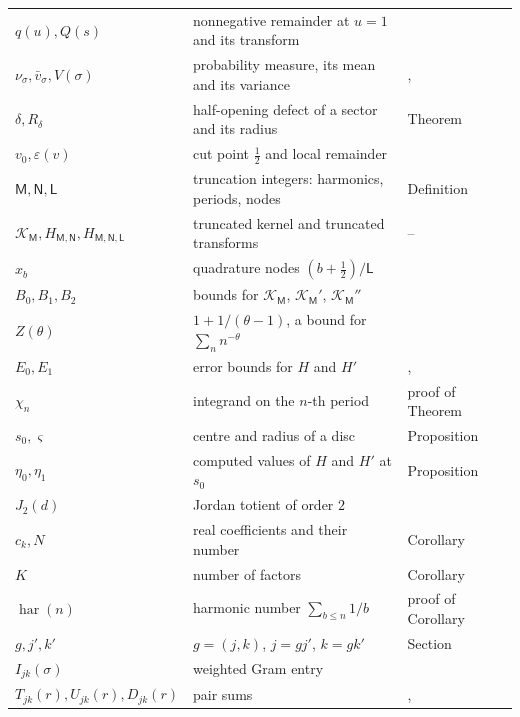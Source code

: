 \documentclass[11pt,reqno]{amsart}
\makeatletter
\let\CG@origref\ref
\let\CG@origeqref\eqref
\newcommand{\CG@gettip}[1]{\@ifundefined{CGTip@#1}{Reference: #1}{\csname CGTip@#1\endcsname}}
\DeclareRobustCommand{\CGref}[1]{\pdftooltip{\CG@origref{#1}}{\CG@gettip{#1}}}
\DeclareRobustCommand{\CGeqref}[1]{\pdftooltip{\CG@origeqref{#1}}{\CG@gettip{#1}}}
\numberwithin{equation}{section}
\theoremstyle{plain}
\theoremstyle{definition}
\theoremstyle{remark}
\makeatother
\begin{document}
\begin{longtable}{>{\raggedright\arraybackslash}p{}>{\raggedright\arraybackslash}p{}>{\raggedright\arraybackslash}p{}}
$q(u),Q(s)$ & nonnegative remainder at $u=1$ and its transform & \CGeqref{eq:q}\\
$\nu_\sigma,\bar v_\sigma,V(\sigma)$ & probability measure, its mean and its variance & \CGeqref{eq:measure}, \CGeqref{eq:logconvex}\\
$\delta,R_\delta$ & half-opening defect of a sector and its radius & Theorem~\CGref{thm:sector}\\
$v_0,\varepsilon(v)$ & cut point $\frac12$ and local remainder & \CGeqref{eq:localh}\\
$\mathsf M,\mathsf N,\mathsf L$ & truncation integers: harmonics, periods, nodes & Definition~\CGref{def:trunc}\\
$\mathcal K_{\mathsf M},H_{\mathsf M,\mathsf N},H_{\mathsf M,\mathsf N,\mathsf L}$ & truncated kernel and truncated transforms & \CGeqref{eq:KM}--\CGeqref{eq:HMNL}\\
$x_b$ & quadrature nodes $(b+\frac12)/\mathsf L$ & \CGeqref{eq:HMNL}\\
$B_0,B_1,B_2$ & bounds for $\mathcal K_{\mathsf M}$, $\mathcal K_{\mathsf M}'$, $\mathcal K_{\mathsf M}''$ & \CGeqref{eq:Bdefs}\\
$Z(\theta)$ & $1+1/(\theta-1)$, a bound for $\sum_nn^{-\theta}$ & \CGeqref{eq:Bdefs}\\
$E_0,E_1$ & error bounds for $H$ and $H'$ & \CGeqref{eq:E0expr}, \CGeqref{eq:E1expr}\\
$\chi_n$ & integrand on the $n$-th period & proof of Theorem~\CGref{thm:trunc}\\
$s_0,\varsigma$ & centre and radius of a disc & Proposition~\CGref{prop:rouche}\\
$\eta_0,\eta_1$ & computed values of $H$ and $H'$ at $s_0$ & Proposition~\CGref{prop:rouche}\\
$J_2(d)$ & Jordan totient of order $2$ & \CGeqref{eq:J2}\\
$c_k,N$ & real coefficients and their number & Corollary~\CGref{cor:squares}\\
$K$ & number of factors & Corollary~\CGref{cor:partial}\\
$\operatorname{har}(n)$ & harmonic number $\sum_{b\le n}1/b$ & proof of Corollary~\CGref{cor:partial}\\
$g,j',k'$ & $g=(j,k)$, $j=gj'$, $k=gk'$ & Section~\CGref{sec:weighted}\\
$I_{jk}(\sigma)$ & weighted Gram entry & \CGeqref{eq:I}\\
$T_{jk}(r),U_{jk}(r),D_{jk}(r)$ & pair sums & \CGeqref{eq:T}, \CGeqref{eq:U}\\

\end{longtable}
\end{document}
